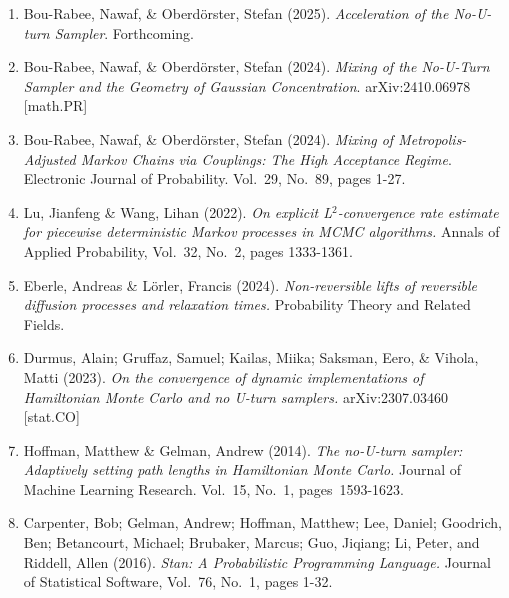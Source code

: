 \documentclass[12pt,lettersize,oneside]{book} %
\begin{document}
\begin{talk}
\begin{enumerate}
 \item[{[1]}] Bou-Rabee, Nawaf, \& Oberd\"{o}rster, Stefan (2025). {\it Acceleration of the No-U-turn Sampler}. Forthcoming.
 \item[{[2]}] Bou-Rabee, Nawaf, \& Oberd\"{o}rster, Stefan (2024). {\it Mixing of the No-U-Turn Sampler and the Geometry of Gaussian Concentration}. arXiv:2410.06978 [math.PR]
 \item[{[3]}] Bou-Rabee, Nawaf, \& Oberd\"{o}rster, Stefan (2024). {\it Mixing of Metropolis-Adjusted Markov Chains via Couplings: The High Acceptance Regime}. Electronic Journal of Probability. Vol.~29,  No.~89, pages 1-27.  
 \item[{[4]}]  Lu, Jianfeng \& Wang, Lihan (2022). {\it On explicit L$^2$-convergence rate estimate for piecewise deterministic Markov processes in MCMC algorithms.} Annals of Applied Probability, Vol.~32, No.~2, pages 1333-1361.
 \item[{[5]}] Eberle, Andreas \& L\"{o}rler, Francis (2024). {\it Non-reversible lifts of reversible diffusion processes and relaxation times.} Probability Theory and Related Fields.
 \item[{[6]}] Durmus, Alain;  Gruffaz, Samuel;  Kailas, Miika;  Saksman, Eero, \&  Vihola, Matti (2023). {\it On the convergence of
dynamic implementations of Hamiltonian Monte Carlo and no U-turn samplers.} arXiv:2307.03460  [stat.CO] 
\item[{[7]}]  Hoffman, Matthew  \& Gelman, Andrew  (2014). {\it The no-U-turn sampler: Adaptively setting path lengths in
Hamiltonian Monte Carlo.} Journal of Machine Learning Research. Vol.~15, No.~1, pages~1593-1623.
\item[{[8]}]   Carpenter, Bob; Gelman, Andrew;  Hoffman, Matthew; Lee, Daniel;  Goodrich, Ben; Betancourt, Michael; Brubaker, Marcus;
Guo, Jiqiang; Li, Peter, and  Riddell, Allen  (2016). {\em Stan: A Probabilistic Programming Language.} Journal of
Statistical Software, Vol.~76, No.~1, pages 1-32.
\end{enumerate}
\end{talk}
\end{document}
